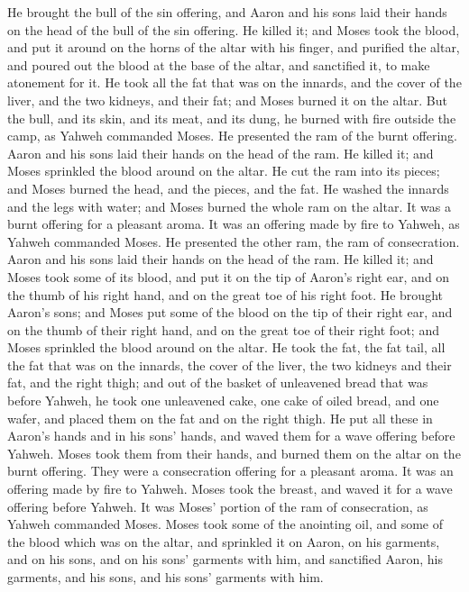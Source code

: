  He brought the bull of the sin offering, and Aaron and his
sons laid their hands on the head of the bull of the sin offering.
 He killed it; and Moses took the blood, and put it around
on the horns of the altar with his finger, and purified the altar, and
poured out the blood at the base of the altar, and sanctified it, to
make atonement for it.  He took all the fat that was on the
innards, and the cover of the liver, and the two kidneys, and their fat;
and Moses burned it on the altar.  But the bull, and its
skin, and its meat, and its dung, he burned with fire outside the camp,
as Yahweh commanded Moses.  He presented the ram of the
burnt offering. Aaron and his sons laid their hands on the head of the
ram.  He killed it; and Moses sprinkled the blood around on
the altar.  He cut the ram into its pieces; and Moses
burned the head, and the pieces, and the fat.  He washed
the innards and the legs with water; and Moses burned the whole ram on
the altar. It was a burnt offering for a pleasant aroma. It was an
offering made by fire to Yahweh, as Yahweh commanded Moses.
 He presented the other ram, the ram of consecration. Aaron
and his sons laid their hands on the head of the ram.  He
killed it; and Moses took some of its blood, and put it on the tip of
Aaron's right ear, and on the thumb of his right hand, and on the great
toe of his right foot.  He brought Aaron's sons; and Moses
put some of the blood on the tip of their right ear, and on the thumb of
their right hand, and on the great toe of their right foot; and Moses
sprinkled the blood around on the altar.  He took the fat,
the fat tail, all the fat that was on the innards, the cover of the
liver, the two kidneys and their fat, and the right thigh; 
and out of the basket of unleavened bread that was before Yahweh, he
took one unleavened cake, one cake of oiled bread, and one wafer, and
placed them on the fat and on the right thigh.  He put all
these in Aaron's hands and in his sons' hands, and waved them for a wave
offering before Yahweh.  Moses took them from their hands,
and burned them on the altar on the burnt offering. They were a
consecration offering for a pleasant aroma. It was an offering made by
fire to Yahweh.  Moses took the breast, and waved it for a
wave offering before Yahweh. It was Moses' portion of the ram of
consecration, as Yahweh commanded Moses.  Moses took some
of the anointing oil, and some of the blood which was on the altar, and
sprinkled it on Aaron, on his garments, and on his sons, and on his
sons' garments with him, and sanctified Aaron, his garments, and his
sons, and his sons' garments with him.

